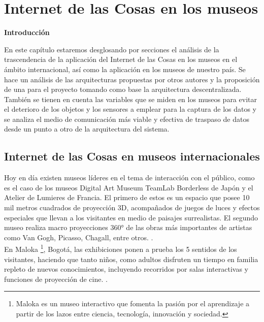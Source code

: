 \chapter{Internet de las Cosas en los museos} \label{cap:aproxTeoricas}

        \textbf{\Large Introducción}\newline

        En este capítulo estaremos desglosando por secciones el análisis de la trascendencia de la aplicación del Internet de las Cosas en los museos en el ámbito internacional, así como la aplicación en los museos de nuestro país.
        Se hace un análisis de las arquitecturas propuestas por otros autores y la proposición de una para el proyecto tomando como base la arquitectura descentralizada.
        También se tienen en cuenta las variables que se miden en los museos para evitar el deterioro de los objetos y los sensores a emplear para la captura de los datos y se analiza el medio de comunicación más viable y efectiva de traspaso de datos desde un punto a otro de la arquitectura del sistema.
    
    \section{Internet de las Cosas en museos internacionales}\label{sec:iotMundo}
        
        Hoy en día existen museos líderes en el tema de interacción con el público, como es el caso de los museos Digital Art Museum TeamLab Borderless de Japón y el Atelier de Lumieres de Francia. El primero de estos es un espacio que posee 10 mil metros cuadrados de proyección 3D, acompañados de juegos de luces y efectos especiales que llevan a los visitantes en medio de paisajes surrealistas. El segundo museo realiza macro proyecciones 360° de las obras más importantes de artistas como Van Gogh, Picasso, Chagall, entre otros. \cite{museoInterSalaLimpia}.\\

        En Maloka \footnote{Maloka es un museo interactivo que fomenta la pasión por el aprendizaje a partir de los lazos entre ciencia, tecnología, innovación y sociedad.}, Bogotá, las exhibiciones ponen a prueba los 5 sentidos de los visitantes, haciendo que tanto niños, como adultos disfruten un tiempo en familia repleto de nuevos conocimientos, incluyendo recorridos por salas interactivas y funciones de proyección de cine. \cite{maloka}.\\

